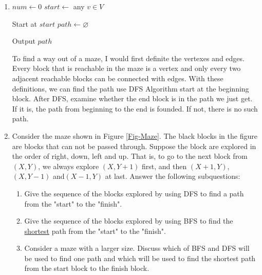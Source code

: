 \documentclass[12pt,a4paper]{article}
\makeatletter
\newtheorem*{solution}{Solution}
\theoremstyle{definition}
\renewenvironment{solution}[1][Solution] {\par\pushQED{\qed}\normalfont\topsep6\p@\@plus6\p@\relax\trivlist\item[\hskip\labelsep\bfseries#1\@addpunct{.}]\ignorespaces}{\popQED\endtrivlist\@endpefalse} \makeatother
\makeatother
\begin{document}
\begin{enumerate}
\begin{solution}
\begin{algorithm}[H]
            $num\leftarrow 0$\;
            $start\leftarrow $ any $v\in V$\;



            Start at $start$\;
            $path\leftarrow\varnothing $

            Output $path$\;

        \end{algorithm}

        To find a way out of a maze, I would first definite the vertexes and edges. Every block that is reachable in the maze is a vertex and only every two adjacent reachable blocks can be connected with edges. With these definitions, we can find the path use DFS Algorithm start at the beginning block. After DFS, examine whether the end block is in the path we just get. If it is, the path from beginning to the end is founded. If not, there is no such path.
    \end{solution}

    \item Consider the maze shown in Figure \ref{Fig-Maze}. The black blocks in the figure are blocks that can not be passed through. Suppose the block are explored in the order of right, down, left and up. That is, to go to the next block from $(X,Y)$, we always explore $(X,Y+1)$ first, and then $(X+1,Y)$,$(X,Y-1)$ and$(X-1,Y)$ at last. Answer the following subquestions:
    \begin{enumerate}
        \item Give the sequence of the blocks explored by using DFS to find a path from the "start" to the "finish".
        \item Give the sequence of the blocks explored by using BFS to find the \underline{shortest} path from the "start" to the "finish".
        \item Consider a maze with a larger size. Discuss which of BFS and DFS will be used to find one path and which will be used to find the shortest path from the start block to the finish block.
    \end{enumerate}
    

\end{enumerate}
\end{document}
